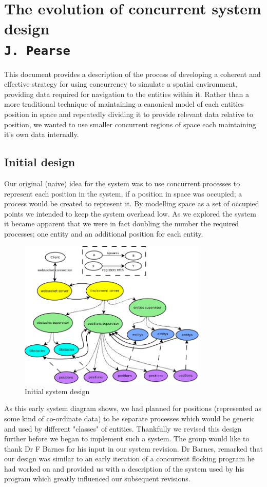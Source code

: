 \pagestyle{empty}

\section{The evolution of concurrent system design\\{\small\tt{J.~Pearse}}}
\label{system-design}
This document provides a description of the process of developing a coherent and effective strategy for using concurrency to simulate a spatial environment, providing data required for navigation to the entities within it.
Rather than a more traditional technique of maintaining a canonical model of each entities position in space and repeatedly dividing it to provide relevant data relative to position, we wanted to use smaller concurrent regions of space each maintaining it's own data internally.
\subsection{Initial design}
Our original (naive) idea for the system was to use concurrent processes to represent each position in the system, if a position in space was occupied; a process would be created to represent it. By modelling space as a set of occupied points we intended to keep the system overhead low. As we explored the system it became apparent that we were in fact doubling the number the required processes; one entity and an additional position for each entity.
\begin{figure}[h]
  \centering
  \includegraphics[width=0.8\textwidth]{img/HighLevelProcess.png}
\caption{Initial system design}
    \label{fig:Initial system design}
\end{figure}
As this early system diagram shows, we had planned for positions (represented as some kind of co-ordinate data) to be separate processes which would be generic and used by different "classes" of entities. Thankfully we revised this design further before we began to implement such a system.
The group would like to thank Dr F Barnes for his input in our system revision. Dr Barnes, remarked that our design was similar to an early iteration of a concurrent flocking program he had worked on and provided us with a description of the system used by his program which greatly influenced our subsequent revisions.

